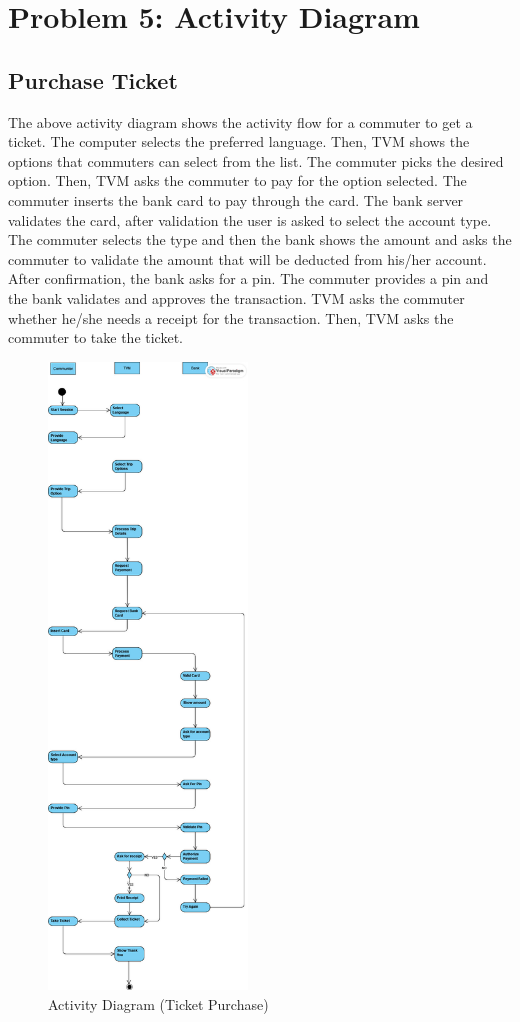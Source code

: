 \documentclass{article}
\begin{document}
{\section{Problem 5: Activity Diagram}
\subsection{Purchase Ticket}
The above activity diagram shows the activity flow for a commuter to get a ticket. The computer selects the preferred language. Then, TVM shows the options that commuters can select from the list. The commuter picks the desired option. Then, TVM asks the commuter to pay for the option selected. The commuter inserts the bank card to pay through the card. The bank server validates the card, after validation the user is asked to select the account type. The commuter selects the type and then the bank shows the amount and asks the commuter to validate the amount that will be deducted from his/her account. After confirmation, the bank asks for a pin. The commuter provides a pin and the bank validates and approves the transaction. TVM asks the commuter whether he/she needs a receipt for the transaction. Then, TVM asks the commuter to take the ticket. 
\begin{figure}[!h]
    \begin{center}
        \includegraphics[width=2.085in]{Ticket.png}
        \caption{Activity Diagram (Ticket Purchase)}
    \end{center}
\end{figure}
}
\end{document}
